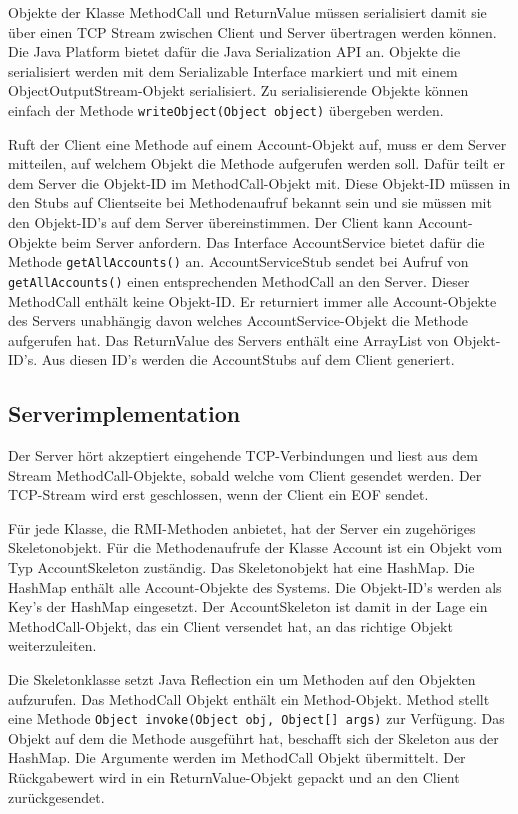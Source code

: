 Objekte der Klasse MethodCall und ReturnValue müssen serialisiert
da\-mit sie über einen TCP Stream zwischen Client und Server übertragen
werden können. Die Java Platform bietet dafür die Java Serialization
API an. Objekte die serialisiert werden mit dem Serializable Interface
markiert und mit einem ObjectOutputStream-Objekt serialisiert. Zu
serialisierende Objekte können einfach der Methode
\verb|writeObject(Object object)| übergeben werden.

Ruft der Client eine Methode auf einem Account-Objekt auf, muss er dem
Server mitteilen, auf welchem Objekt die Methode aufgerufen werden
soll. Dafür teilt er dem Server die Objekt-ID im MethodCall-Objekt
mit. Diese Objekt-ID müssen in den Stubs auf Clientseite bei
Methodenaufruf bekannt sein und sie müssen mit den Objekt-ID's auf dem
Server übereinstimmen. Der Client kann Account-Objekte beim Server
anfordern. Das Interface AccountService bietet dafür die Methode
\verb|getAllAccounts()| an. AccountServiceStub
sendet bei Aufruf von \verb|getAllAccounts()|
einen entsprechenden MethodCall an den Server. Dieser MethodCall
enthält keine Objekt-ID. Er returniert immer alle Account-Objekte des
Servers unabhängig davon welches AccountService-Objekt die Methode
aufgerufen hat. Das ReturnValue des Servers enthält eine ArrayList von
Objekt-ID's. Aus diesen ID's werden die AccountStubs auf dem Client generiert.

\subsection{Serverimplementation}
\label{sec:serverimplementation}

Der Server hört akzeptiert eingehende TCP-Verbindungen und liest aus
dem Stream MethodCall-Objekte, sobald welche vom Client gesendet
werden. Der TCP-Stream wird erst geschlossen, wenn der Client ein EOF
sendet.

Für jede Klasse, die RMI-Methoden anbietet, hat der Server ein
zuge\-hö\-ri\-ges Skeletonobjekt. Für die Methodenaufrufe
der Klasse Account ist ein Objekt vom Typ
AccountSkeleton zuständig. Das Skeletonobjekt hat eine HashMap. Die
HashMap enthält alle Account-Objekte des Systems. Die Objekt-ID's
werden als Key's der HashMap eingesetzt. Der AccountSkeleton ist damit
in der Lage ein MethodCall-Objekt, das ein Client versendet hat, an
das richtige Objekt weiterzuleiten. 

Die Skeletonklasse setzt Java Reflection ein um Methoden auf den
Objekten aufzurufen. Das MethodCall Objekt enthält ein
Method-Objekt. Method stellt eine Methode \verb|Object invoke(Object obj, Object[] args)|\- zur\- Ver\-füg\-ung. Das Objekt auf dem die Methode
ausgeführt hat, beschafft sich der Skeleton aus der HashMap. Die
Argumente werden im MethodCall Objekt übermittelt. Der Rückgabewert
wird in ein ReturnValue-Objekt gepackt und an den Client zurückgesendet.

